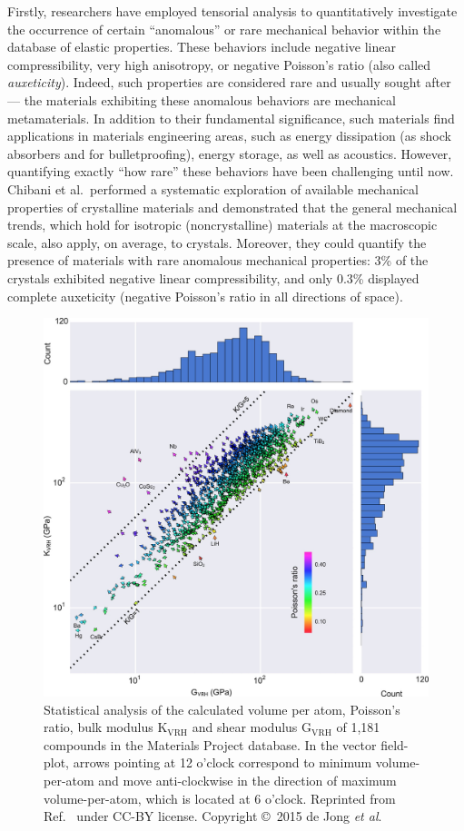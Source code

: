 \documentclass[main.tex]{subfiles}
\begin{document}
Firstly, researchers have employed tensorial analysis to quantitatively investigate the occurrence of certain ``anomalous'' or rare mechanical behavior within the database of elastic properties. These behaviors include negative linear compressibility, very high anisotropy, or negative Poisson's ratio (also called \emph{auxeticity}). Indeed, such properties are considered rare and usually sought after --- the materials exhibiting these anomalous behaviors are mechanical metamaterials.\autocite{Coudert_2019} In addition to their fundamental significance, such materials find applications in materials engineering areas, such as energy dissipation (as shock absorbers and for bulletproofing), energy storage, as well as acoustics.\autocite{Surjadi_2018} However, quantifying exactly ``how rare'' these behaviors have been challenging until now. Chibani et al.\ performed a systematic exploration of available mechanical properties of crystalline materials and demonstrated that the general mechanical trends, which hold for isotropic (noncrystalline) materials at the macroscopic scale, also apply, on average, to crystals. Moreover, they could quantify the presence of materials with rare anomalous mechanical properties: {3\%} of the crystals exhibited negative linear compressibility, and only {0.3\%} displayed complete auxeticity (negative Poisson's ratio in all directions of space).

\begin{figure}[ht]
\centering
  \includegraphics[width=0.8\linewidth]{figures/1-screening/deJong2015.jpeg}
  \caption{Statistical analysis of the calculated volume per atom, Poisson's ratio, bulk modulus {$\mathrm{K_{VRH}}$} and shear modulus {$\mathrm{G_{VRH}}$ of} 1,181 compounds in the Materials Project database. In the vector field-plot, arrows pointing at 12 o'clock correspond to minimum volume-per-atom and move anti-clockwise in the direction of maximum volume-per-atom, which is located at 6 o'clock. Reprinted from Ref.~\cite{deJong_2015} under CC-BY license. Copyright \copyright\  2015 de Jong \emph{et al}.}\label{fgr:deJong2015}
\end{figure}
\end{document}
